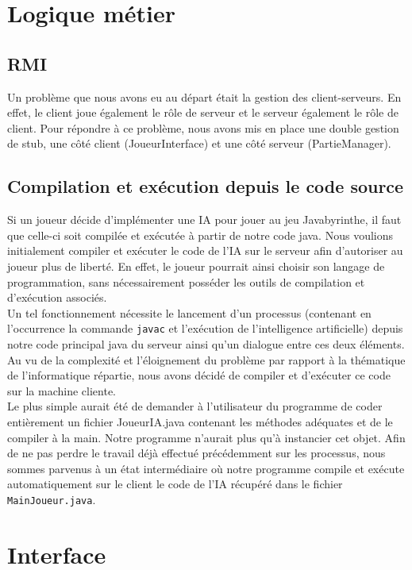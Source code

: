 \section{Logique métier}

    \subsection{RMI}
        Un problème que nous avons eu au départ était la gestion des client-serveurs. En effet, le client joue également le rôle de serveur et le serveur également le rôle de client. Pour répondre à ce problème, nous avons mis en place une double gestion de stub, une côté client (JoueurInterface) et une côté serveur (PartieManager).

    \subsection{Compilation et exécution depuis le code source}
	\label{problemes_IA}

        Si un joueur décide d'implémenter une IA pour jouer au jeu Javabyrinthe, il faut que celle-ci soit compilée et exécutée à partir de notre code java. Nous voulions initialement compiler et exécuter le code de l'IA sur le serveur afin d'autoriser au joueur plus de liberté. En effet, le joueur pourrait ainsi choisir son langage de programmation, sans nécessairement posséder les outils de compilation et d'exécution associés. \\

		Un tel fonctionnement nécessite le lancement d'un processus (contenant en l'occurrence la commande \texttt{javac} et l'exécution de l'intelligence artificielle) depuis notre code principal java du serveur ainsi qu'un dialogue entre ces deux éléments. Au vu de la complexité et l'éloignement du problème par rapport à la thématique de l'informatique répartie, nous avons décidé de compiler et d'exécuter ce code sur la machine cliente. \\

		Le plus simple aurait été de demander à l'utilisateur du programme de coder entièrement un fichier JoueurIA.java contenant les méthodes adéquates et de le compiler à la main. Notre programme n'aurait plus qu'à instancier cet objet. Afin de ne pas perdre le travail déjà effectué précédemment sur les processus, nous sommes parvenus à un état intermédiaire où notre programme compile et exécute automatiquement sur le client le code de l'IA récupéré dans le fichier \texttt{MainJoueur.java}.


\section{Interface}
